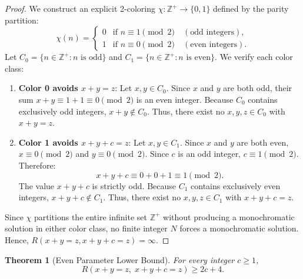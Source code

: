 \documentclass[11pt]{article}
\newtheorem{theorem}{Theorem}
\theoremstyle{definition}
\begin{document}
\begin{proof}
We construct an explicit 2-coloring $\chi: \mathbb{Z}^+ \to \{0, 1\}$ defined by the parity partition:
\begin{equation}
    \chi(n) = \begin{cases} 
    0 & \text{if } n \equiv 1 \pmod 2 \quad (\text{odd integers}), \\
    1 & \text{if } n \equiv 0 \pmod 2 \quad (\text{even integers}).
    \end{cases}
\end{equation}
Let $C_0 = \{n \in \mathbb{Z}^+ : n \text{ is odd}\}$ and $C_1 = \{n \in \mathbb{Z}^+ : n \text{ is even}\}$. We verify each color class:

\begin{enumerate}
    \item \textbf{Color 0 avoids $x + y = z$}: Let $x, y \in C_0$. Since $x$ and $y$ are both odd, their sum $x + y \equiv 1 + 1 \equiv 0 \pmod 2$ is an even integer. Because $C_0$ contains exclusively odd integers, $x + y \notin C_0$. Thus, there exist no $x, y, z \in C_0$ with $x + y = z$.
    \item \textbf{Color 1 avoids $x + y + c = z$}: Let $x, y \in C_1$. Since $x$ and $y$ are both even, $x \equiv 0 \pmod 2$ and $y \equiv 0 \pmod 2$. Since $c$ is an odd integer, $c \equiv 1 \pmod 2$. Therefore:
    \begin{equation}
        x + y + c \equiv 0 + 0 + 1 \equiv 1 \pmod 2.
    \end{equation}
    The value $x + y + c$ is strictly odd. Because $C_1$ contains exclusively even integers, $x + y + c \notin C_1$. Thus, there exist no $x, y, z \in C_1$ with $x + y + c = z$.
\end{enumerate}

Since $\chi$ partitions the entire infinite set $\mathbb{Z}^+$ without producing a monochromatic solution in either color class, no finite integer $N$ forces a monochromatic solution. Hence, $R(x+y=z, x+y+c=z) = \infty$.
\end{proof}

\begin{theorem}[Even Parameter Lower Bound]\label{thm:even_lower}
For every integer $c \ge 1$,
\begin{equation}
    R(x+y=z, \; x+y+c=z) \ge 2c + 4.
\end{equation}
\end{theorem}
\end{document}
